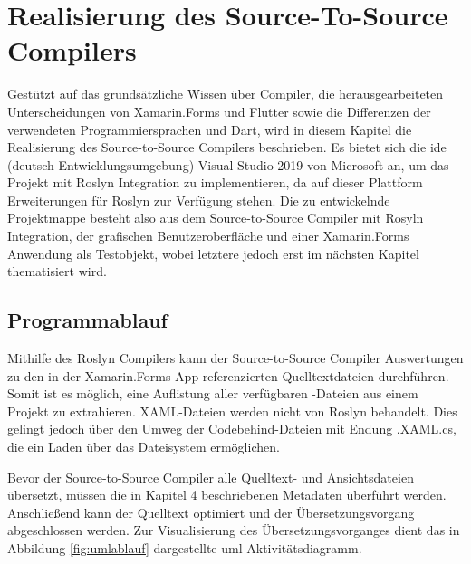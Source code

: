 \chapter{Realisierung des Source-To-Source Compilers}
\label{chap:Realisierung}
Gestützt auf das grundsätzliche Wissen über Compiler, die herausgearbeiteten Unterscheidungen von  Xamarin.Forms und Flutter sowie die Differenzen der verwendeten Programmiersprachen  \Csharp{} und Dart, wird in diesem Kapitel die Realisierung des Source-to-Source Compilers beschrieben.  Es bietet sich die \ac{ide} (deutsch Entwicklungsumgebung) Visual Studio 2019 von Microsoft an,  um das Projekt mit Roslyn Integration zu implementieren,  da auf dieser Plattform Erweiterungen für Roslyn zur Verfügung stehen.
Die zu entwickelnde Projektmappe besteht also aus dem Source-to-Source Compiler mit Rosyln Integration, der grafischen Benutzeroberfläche und einer Xamarin.Forms Anwendung als Testobjekt,  wobei letztere jedoch erst im nächsten Kapitel thematisiert wird.


\section{Programmablauf}
Mithilfe des Roslyn Compilers kann der Source-to-Source Compiler Auswertungen zu den in der Xamarin.Forms App referenzierten Quelltextdateien durchführen.  Somit ist es möglich,  eine Auflistung aller verfügbaren \Csharp-Dateien aus einem Projekt zu extrahieren.  XAML-Dateien werden nicht von Roslyn behandelt.  Dies gelingt jedoch über den Umweg der Codebehind-Dateien mit Endung .XAML.cs,  die ein Laden über das Dateisystem ermöglichen. 

Bevor der Source-to-Source Compiler alle Quelltext- und Ansichtsdateien übersetzt,  müssen die in Kapitel 4 beschriebenen Metadaten überführt werden.  Anschließend kann der Quelltext optimiert und der Übersetzungsvorgang abgeschlossen werden.  Zur Visualisierung des Übersetzungsvorganges dient das in Abbildung \ref{fig:umlablauf} dargestellte \ac{uml}-Aktivitätsdiagramm.

